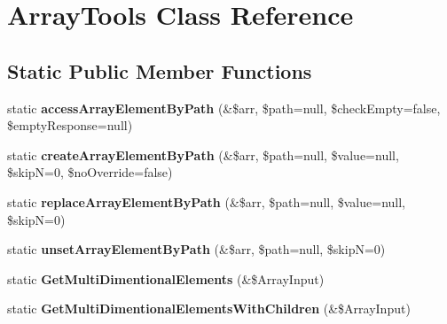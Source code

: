 \hypertarget{class_tools_1_1_array_tools}{
\section{\-Array\-Tools \-Class \-Reference}
\label{class_tools_1_1_array_tools}
}
\subsection*{\-Static \-Public \-Member \-Functions}
\begin{DoxyCompactItemize}
\item 
\hypertarget{class_tools_1_1_array_tools_a6811f8bb33f8c3d81bfd7581f7c39048}{
static {\bfseries access\-Array\-Element\-By\-Path} (\&\$arr, \$path=null, \$check\-Empty=false, \$empty\-Response=null)}
\label{class_tools_1_1_array_tools_a6811f8bb33f8c3d81bfd7581f7c39048}

\item 
\hypertarget{class_tools_1_1_array_tools_a8b796d04f5d4cdfafd6e328a67b161da}{
static {\bfseries create\-Array\-Element\-By\-Path} (\&\$arr, \$path=null, \$value=null, \$skip\-N=0, \$no\-Override=false)}
\label{class_tools_1_1_array_tools_a8b796d04f5d4cdfafd6e328a67b161da}

\item 
\hypertarget{class_tools_1_1_array_tools_a42ceb39dec78ac78017d4a335af0e16d}{
static {\bfseries replace\-Array\-Element\-By\-Path} (\&\$arr, \$path=null, \$value=null, \$skip\-N=0)}
\label{class_tools_1_1_array_tools_a42ceb39dec78ac78017d4a335af0e16d}

\item 
\hypertarget{class_tools_1_1_array_tools_a45c19147af2ae7f3b4271bcd0ed3ed01}{
static {\bfseries unset\-Array\-Element\-By\-Path} (\&\$arr, \$path=null, \$skip\-N=0)}
\label{class_tools_1_1_array_tools_a45c19147af2ae7f3b4271bcd0ed3ed01}

\item 
\hypertarget{class_tools_1_1_array_tools_abc634ffc53c98844cbaefaf07c612f7e}{
static {\bfseries \-Get\-Multi\-Dimentional\-Elements} (\&\$\-Array\-Input)}
\label{class_tools_1_1_array_tools_abc634ffc53c98844cbaefaf07c612f7e}

\item 
\hypertarget{class_tools_1_1_array_tools_ac9c58af050780f836befb93714e4bc99}{
static {\bfseries \-Get\-Multi\-Dimentional\-Elements\-With\-Children} (\&\$\-Array\-Input)}
\label{class_tools_1_1_array_tools_ac9c58af050780f836befb93714e4bc99}


\end{DoxyCompactItemize}

